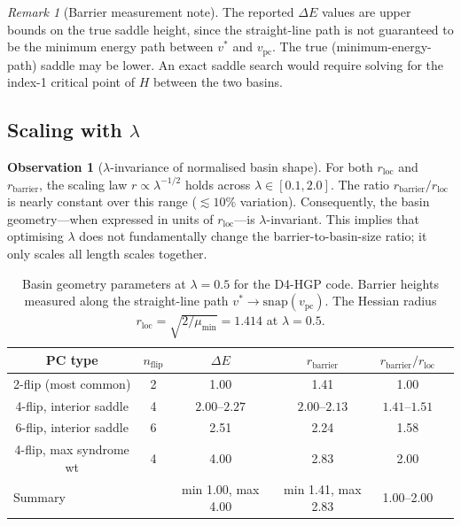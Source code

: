 \documentclass[12pt,a4paper]{article}
\theoremstyle{plain}
\theoremstyle{definition}
\newtheorem{observation}[theorem]{Observation}
\theoremstyle{remark}
\newtheorem{remark}[theorem]{Remark}
\begin{document}
\begin{remark}[Barrier measurement note]
The reported $\Delta E$ values are upper bounds on the true saddle height,
since the straight-line path is not guaranteed to be the minimum energy
path between $v^*$ and $v_{\mathrm{pc}}$.
The true (minimum-energy-path) saddle may be lower.
An exact saddle search would require solving for the index-1 critical
point of $H$ between the two basins.
\end{remark}

\subsection{Scaling with $\lambda$}

\begin{observation}[$\lambda$-invariance of normalised basin shape]
\label{obs:scaling}
For both $r_{\mathrm{loc}}$ and $r_{\mathrm{barrier}}$, the scaling law
$r \propto \lambda^{-1/2}$ holds across $\lambda \in [0.1, 2.0]$.
The ratio $r_{\mathrm{barrier}} / r_{\mathrm{loc}}$ is nearly constant
over this range ($\lesssim 10\%$ variation).
Consequently, the basin geometry---when expressed in units of
$r_{\mathrm{loc}}$---is $\lambda$-invariant.
This implies that optimising $\lambda$ does not fundamentally change the
barrier-to-basin-size ratio; it only scales all length scales together.
\end{observation}

\begin{table}[ht]
\centering
\caption{Basin geometry parameters at $\lambda = 0.5$ for the D4-HGP code.
  Barrier heights measured along the straight-line path $v^* \to \mathrm{snap}(v_{\mathrm{pc}})$.
  The Hessian radius $r_{\mathrm{loc}} = \sqrt{2/\mu_{\min}} = 1.414$ at $\lambda=0.5$.}
\label{tab:barriers}
\small
\begin{tabular}{cccccc}
\toprule
PC type & $n_{\mathrm{flip}}$ & $\Delta E$ & $r_{\mathrm{barrier}}$ & $r_{\mathrm{barrier}}/r_{\mathrm{loc}}$ \\
\midrule
2-flip (most common) & 2 & 1.00 & 1.41 & 1.00 \\
4-flip, interior saddle & 4 & $2.00$--$2.27$ & $2.00$--$2.13$ & $1.41$--$1.51$ \\
6-flip, interior saddle & 6 & 2.51 & 2.24 & 1.58 \\
4-flip, max syndrome wt & 4 & 4.00 & 2.83 & 2.00 \\
\midrule
\multicolumn{2}{l}{Summary} & min 1.00, max 4.00 & min 1.41, max 2.83 & 1.00--2.00 \\
\bottomrule
\end{tabular}
\end{table}
\end{document}
